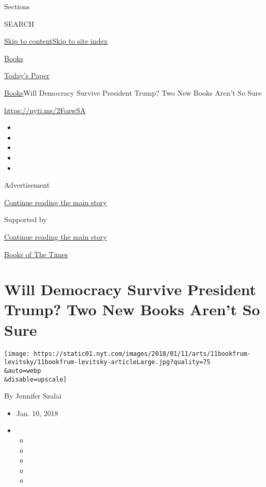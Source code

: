Sections

SEARCH

\protect\hyperlink{site-content}{Skip to
content}\protect\hyperlink{site-index}{Skip to site index}

\href{https://www.nytimes.com/section/books}{Books}

\href{https://myaccount.nytimes.com/auth/login?response_type=cookie\&client_id=vi}{}

\href{https://www.nytimes.com/section/todayspaper}{Today's Paper}

\href{/section/books}{Books}\textbar{}Will Democracy Survive President
Trump? Two New Books Aren't So Sure

\url{https://nyti.ms/2FozwSA}

\begin{itemize}
\item
\item
\item
\item
\item
\end{itemize}

Advertisement

\protect\hyperlink{after-top}{Continue reading the main story}

Supported by

\protect\hyperlink{after-sponsor}{Continue reading the main story}

\href{/column/books-of-the-times}{Books of The Times}

\hypertarget{will-democracy-survive-president-trump-two-new-books-arent-so-sure}{%
\section{Will Democracy Survive President Trump? Two New Books Aren't So
Sure}\label{will-democracy-survive-president-trump-two-new-books-arent-so-sure}}

\texttt{[image: https://static01.nyt.com/images/2018/01/11/arts/11bookfrum-levitsky/11bookfrum-levitsky-articleLarge.jpg?quality=75\\\&auto=webp\\\&disable=upscale]}

By Jennifer Szalai

\begin{itemize}
\item
  Jan. 10, 2018
\item
  \begin{itemize}
  \item
  \item
  \item
  \item
  \item
  \end{itemize}
\end{itemize}

